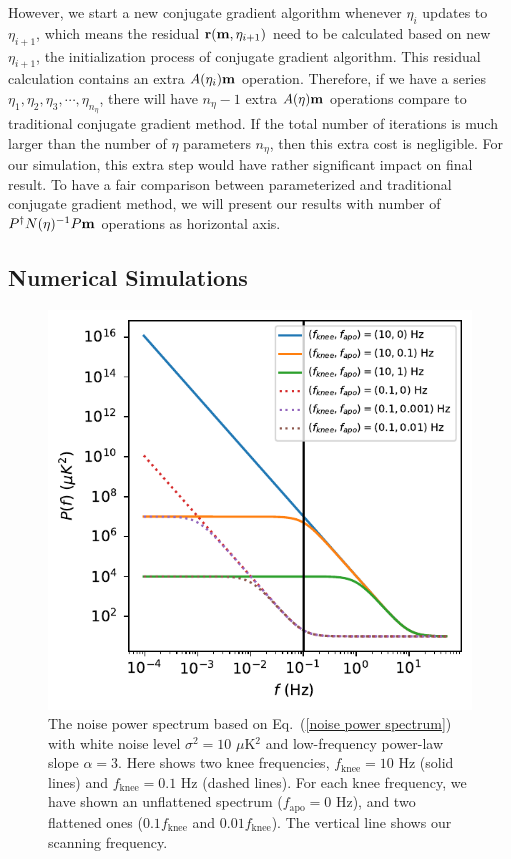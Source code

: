 \documentclass[twocolumn,linenumbers]{aastex631}
\newcommand{\vbm}{\vb{m}}
\newcommand{\inv}[1]{#1^{-1}}
\newcommand{\Pdagger}{P^{\dagger}}
\begin{document}
However, we start a new conjugate gradient algorithm whenever $\eta_i$ updates to $\eta_{i+1}$,
which means the residual $\vb{r}(\vbm, \eta_{i+1})$ need to be calculated based on new $\eta_{i+1}$,
the initialization process of conjugate gradient algorithm.
This residual calculation contains an extra $A(\eta_i) \vbm$ operation.
Therefore, if we have a series $\eta_1, \eta_2, \eta_3, \cdots, \eta_{n_{\eta}}$,
there will have $n_{\eta}-1$ extra $A(\eta) \vbm$ operations compare to traditional conjugate gradient
method.
If the total number of iterations is much larger than the number of $\eta$ parameters $n_{\eta}$,
then this extra cost is negligible.
For our simulation, this extra step would have rather significant impact on final result.
To have a fair comparison between parameterized and traditional conjugate gradient method,
we will present our results with number of $\Pdagger \inv{N(\eta)} P\vbm$ operations as horizontal axis.



\subsection{Numerical Simulations}

\begin{figure}[tb!]
\includegraphics[width=\linewidth]{P_f.pdf}
\centering
\caption{The noise power spectrum based on Eq.~(\ref{noise power spectrum}) with 
    white noise level $\sigma^2 = 10$ $\mu$K$^2$ and low-frequency power-law slope $\alpha = 3$.
    Here shows two knee frequencies, $f_\text{knee}=10$ Hz (solid lines) 
    and $f_\text{knee}=0.1$ Hz (dashed lines).
    For each knee frequency, we have shown an unflattened spectrum ($f_\text{apo}=0$ Hz), and two flattened ones ($0.1f_\text{knee}$ and
    $0.01f_\text{knee}$).
    The vertical line shows our scanning frequency.
}
\label{power spectrum}
\end{figure}
\end{document}
